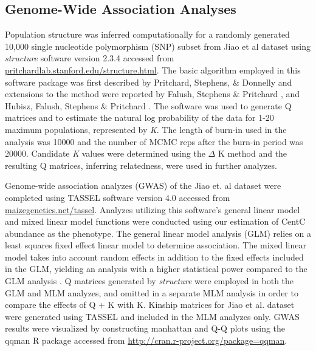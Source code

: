 \documentclass[12pt]{article}
\begin{document}
\subsection{Genome-Wide Association Analyses} %
Population structure was inferred computationally for a randomly generated 10,000 single nucleotide polymorphism (SNP) subset from Jiao et al dataset using \emph{structure} software version 2.3.4 accessed from \url{pritchardlab.stanford.edu/structure.html}.  The basic algorithm employed in this software package was first described by Pritchard, Stephens, \& Donnelly \cite{Pritchard2000} and extensions to the method were reported by Falush, Stephens \& Pritchard \cite{Falush2003}, \cite{Falush2007} and Hubisz, Falush, Stephens \& Pritchard \cite{Hubisz2009}.  The software was used to generate Q matrices and to estimate the natural log probability of the data for 1-20 maximum populations, represented by \emph{K}.  The length of burn-in used in the analysis was 10000 and the number of MCMC reps after the burn-in period was 20000.  Candidate \emph{K} values were determined using the $\Delta$ K method and the resulting Q matrices, inferring relatedness, were used in further analyzes.    

Genome-wide association analyzes (GWAS) of the Jiao et. al dataset were completed using TASSEL \cite{Bradbury2007} software version 4.0 accessed from \url{maizegenetics.net/tassel}.  Analyzes utilizing this software's general linear model and mixed linear model functions were conducted using our estimation of CentC abundance as the phenotype.  The general linear model analysis (GLM) relies on a least squares fixed effect linear model to determine association.  The mixed linear model takes into account random effects in addition to the fixed effects included in the GLM, yielding an analysis with a higher statistical power compared to the GLM analysis \cite{Yu2006}.  Q matrices generated by \emph{structure} were employed in both the GLM and MLM analyzes, and omitted in a separate MLM analysis in order to compare the effects of Q + K with K.  Kinship matrices for Jiao et al. dataset were generated using TASSEL and included in the MLM analyzes only.    
GWAS results were visualized by constructing manhattan and Q-Q plots using the qqman \cite{Turner2014} R package accessed from \url{http://cran.r-project.org/package=qqman}.   
\end{document}
